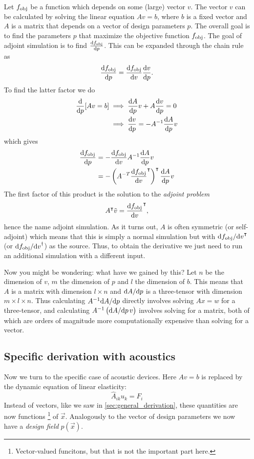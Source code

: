 Let $f_\text{obj}$ be a function which depends on some (large) vector $v$.
The vector $v$ can be calculated by solving the linear equation
$A v = b$, where $b$ is a fixed vector and $A$ is a matrix that depends on a
vector of design parameters $p$.
The overall goal is to find the parameters $p$ that maximize the objective
function $f_\text{obj}$.
The goal of adjoint simulation is to find $\diff{\fobj}{p}$.
This can be expanded through the chain rule as
\[
	\diff{\fobj}{p} = \diff{\fobj}{v} \diff{v}{p}.
\]
To find the latter factor we do
\begin{align*}
	\diff{}{p} [Av = b] &\implies \diff{A}{p} v + A \diff{v}{p} = 0\\
						&\implies \diff{v}{p} = -A^{-1} \diff{A}{p} v
\end{align*}
which gives
\begin{align}
	\diff{\fobj}{p} &= - \diff{\fobj}{v} A^{-1} \diff{A}{p}
	v\label{eq:no_adj_sim}\\
	&= - \left(A^{-T} \diff{\fobj}{v}^\transpose \right)^\transpose \diff{A}{p} v
\end{align}
The first factor of this product is the solution to the \emph{adjoint problem}
\begin{equation}
	A^\transpose \tilde v = \diff{\fobj}{v}^\transpose,
\end{equation}
hence the name adjoint simulation.
As it turns out, $A$ is often symmetric (or self-adjoint) which means that this is simply a normal
simulation but with $\difs{\fobj}{v}^\transpose$ (or $\difs{\fobj}{v}^\dagger$) as the source.
Thus, to obtain the derivative we just need to run an additional
simulation with a different input.

Now you might be wondering: what have we gained by this?
Let $n$ be the dimension of $v$, $m$ the dimension of $p$ and $l$ the dimension
of $b$.
This means that $A$ is a matrix with dimension $l\times n$ and $\difs{A}{p}$ is
a three-tensor with dimension $m\times l\times n$.
Thus calculating $A^{-1} \difs{A}{p}$ directly involves solving $Ax = w$ for a
three-tensor, and calculating $A^{-1} \left(\difs{A}{p}\,v\right)$
involves solving for a matrix, both of which are orders of magnitude more
computationally expensive than solving for a vector.

\subsection{Specific derivation with acoustics}\label{sec:spec_der}

Now we turn to the specific case of acoustic devices.
Here $A v = b$ is replaced by the dynamic equation  of linear elasticity:
\begin{equation}\label{eq:sim_eq}
	\hat A_{ik} u_k = F_i
\end{equation}
Instead of vectors, like we saw in \cref{sec:general_derivation}, these quantities are now functions%
\footnote{%
	Vector-valued funcitons, but that is not the important part here.
}
of $\vec x$.
Analogously to the vector of design parameters we now have a \emph{design field}
$p(\vec x)$.

